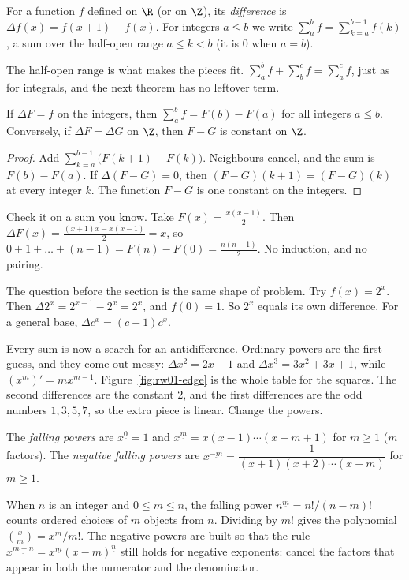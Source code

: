 \begin{definition}
For a function $f$ defined on $\R$ (or on $\Z$), its \emph{difference} is $\Delta f(x)=f(x+1)-f(x)$. For integers
$a\le b$ we write $\sum_a^bf=\sum_{k=a}^{b-1}f(k)$, a sum over the half-open range $a\le k<b$ (it is $0$ when $a=b$).
\end{definition}

The half-open range is what makes the pieces fit. $\sum_a^bf+\sum_b^cf=\sum_a^cf$, just as for integrals, and the next theorem has no leftover term.

\begin{theorem}\label{thm:ftfc}
If $\Delta F=f$ on the integers, then $\sum_a^bf=F(b)-F(a)$ for all integers $a\le b$. Conversely, if
$\Delta F=\Delta G$ on $\Z$, then $F-G$ is constant on $\Z$.
\end{theorem}
\begin{proof}
Add $\sum_{k=a}^{b-1}\bigl(F(k+1)-F(k)\bigr)$. Neighbours cancel, and the sum is $F(b)-F(a)$. If $\Delta(F-G)=0$, then $(F-G)(k+1)=(F-G)(k)$ at every integer $k$. The function $F-G$ is one constant on the integers.
\end{proof}

Check it on a sum you know. Take $F(x)=\frac{x(x-1)}2$. Then $\Delta F(x)=\frac{(x+1)x-x(x-1)}2=x$, so
$0+1+\dots+(n-1)=F(n)-F(0)=\frac{n(n-1)}2$. No induction, and no pairing.

The question before the section is the same shape of problem. Try $f(x)=2^x$. Then $\Delta 2^x=2^{x+1}-2^x=2^x$, and $f(0)=1$. So $2^x$ equals its own difference. For a general base, $\Delta c^x=(c-1)c^x$.

Every sum is now a search for an antidifference. Ordinary powers are the first guess, and they come out messy: $\Delta x^2=2x+1$ and $\Delta x^3=3x^2+3x+1$, while $(x^m)'=mx^{m-1}$. Figure~\ref{fig:rw01-edge} is the whole table for the squares. The second differences are the constant $2$, and the first differences are the odd numbers $1,3,5,7$, so the extra piece is linear. Change the powers.

\begin{definition}
The \emph{falling powers} are $x^{\underline 0}=1$ and $x^{\underline m}=x(x-1)\cdots(x-m+1)$ for $m\ge1$ ($m$ factors).
The \emph{negative falling powers} are $x^{\underline{-m}}=\dfrac1{(x+1)(x+2)\cdots(x+m)}$ for $m\ge1$.
\end{definition}

When $n$ is an integer and $0\le m\le n$, the falling power $n^{\underline m}=n!/(n-m)!$ counts ordered choices of $m$ objects from $n$. Dividing by $m!$ gives the polynomial $\binom xm=x^{\underline m}/m!$. The negative powers are built so that the rule $x^{\underline{m+n}}=x^{\underline m}(x-m)^{\underline n}$ still holds for negative exponents: cancel the factors that appear in both the numerator and the denominator.

